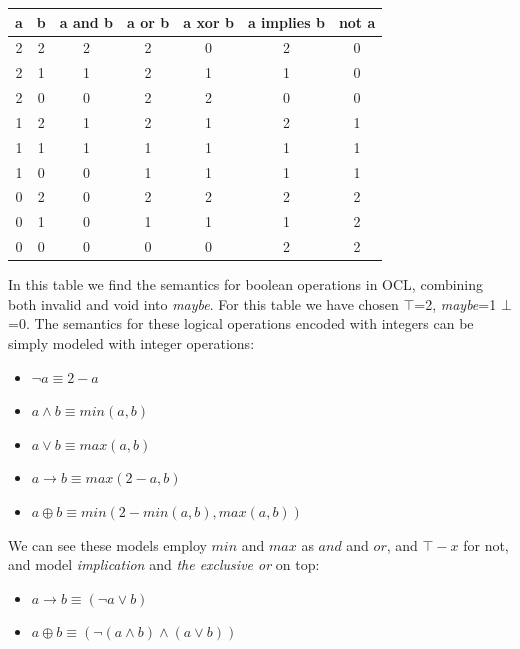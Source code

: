 \begin{table}[!ht]
    \begin{tabular}{c|c|c|c|c|c|c}
    a & b & a and b & a or b & a xor b & a implies b & not a \\ \hline
    2 & 2 & 2       & 2      & 0       & 2           & 0     \\ \hline
    2 & 1 & 1       & 2      & 1       & 1           & 0     \\ \hline
    2 & 0 & 0       & 2      & 2       & 0           & 0     \\ \hline
    1 & 2 & 1       & 2      & 1       & 2           & 1     \\ \hline
    1 & 1 & 1       & 1      & 1       & 1           & 1     \\ \hline
    1 & 0 & 0       & 1      & 1       & 1           & 1     \\ \hline
    0 & 2 & 0       & 2      & 2       & 2           & 2     \\ \hline
    0 & 1 & 0       & 1      & 1       & 1           & 2     \\ \hline
    0 & 0 & 0       & 0      & 0       & 2           & 2     
    \end{tabular}
\end{table}
In this table we find the semantics for boolean operations in OCL, combining both invalid and void into \textit{maybe}.
For this table we have chosen $\top$=2, \textit{maybe}=1 $\bot$=0.
The semantics for these logical operations encoded with integers can be simply modeled with integer operations:
\begin{itemize}
    \item $\neg a \equiv 2-a$
    \item $a \wedge b \equiv min(a,b)$
    \item $a \vee b \equiv max(a,b)$
    \item $a \rightarrow b \equiv max(2-a,b)$
    \item $a \oplus b \equiv min(2-min(a,b),max(a,b))$
\end{itemize}
We can see these models employ $min$ and $max$ as $and$ and $or$, and $\top -x$ for not, and model \textit{implication} and \textit{the exclusive or} on top:
\begin{itemize}
    \item $a \rightarrow b \equiv (\neg a \vee b)$
    \item $a \oplus b \equiv (\neg(a \wedge b) \wedge (a \vee b))$
\end{itemize}

